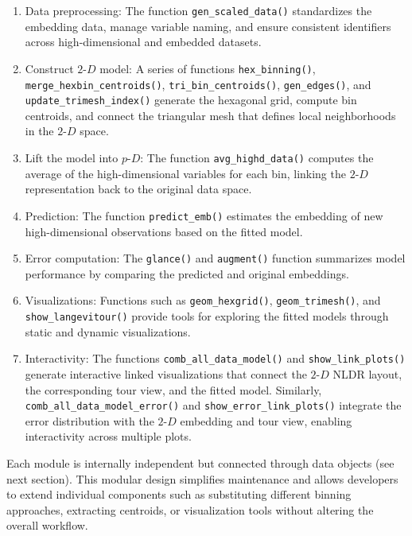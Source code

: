 \begin{enumerate}
\def\labelenumi{\arabic{enumi}.}
\item
  Data preprocessing: The function \texttt{gen\_scaled\_data()} standardizes the embedding data, manage variable naming, and ensure consistent identifiers across high-dimensional and embedded datasets.
\item
  Construct \(2\text{-}D\) model: A series of functions \texttt{hex\_binning()}, \texttt{merge\_hexbin\_centroids()}, \texttt{tri\_bin\_centroids()}, \texttt{gen\_edges()}, and \texttt{update\_trimesh\_index()} generate the hexagonal grid, compute bin centroids, and connect the triangular mesh that defines local neighborhoods in the \(2\text{-}D\) space.
\item
  Lift the model into \(p\text{-}D\): The function \texttt{avg\_highd\_data()} computes the average of the high-dimensional variables for each bin, linking the \(2\text{-}D\) representation back to the original data space.
\item
  Prediction: The function \texttt{predict\_emb()} estimates the embedding of new high-dimensional observations based on the fitted model.
\item
  Error computation: The \texttt{glance()} and \texttt{augment()} function summarizes model performance by comparing the predicted and original embeddings.
\item
  Visualizations: Functions such as \texttt{geom\_hexgrid()}, \texttt{geom\_trimesh()}, and \texttt{show\_langevitour()} provide tools for exploring the fitted models through static and dynamic visualizations.
\item
  Interactivity: The functions \texttt{comb\_all\_data\_model()} and \texttt{show\_link\_plots()} generate interactive linked visualizations that connect the \(2\text{-}D\) NLDR layout, the corresponding tour view, and the fitted model. Similarly, \texttt{comb\_all\_data\_model\_error()} and \texttt{show\_error\_link\_plots()} integrate the error distribution with the \(2\text{-}D\) embedding and tour view, enabling interactivity across multiple plots.
\end{enumerate}

Each module is internally independent but connected through data objects (see next section). This modular design simplifies maintenance and allows developers to extend individual components such as substituting different binning approaches, extracting centroids, or visualization tools without altering the overall workflow.

